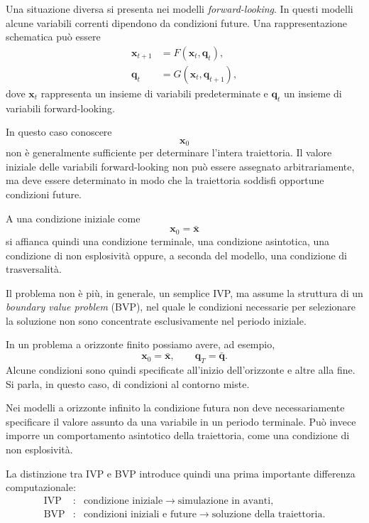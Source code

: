 \documentclass{book}
\begin{document}
Una situazione diversa si presenta nei modelli \emph{forward-looking}.
In questi modelli alcune variabili correnti dipendono da condizioni
future. Una rappresentazione schematica può essere
\[
\begin{aligned}
\mathbf{x}_{t+1}
&=
F(\mathbf{x}_t,\mathbf{q}_t),\\
\mathbf{q}_t
&=
G(\mathbf{x}_t,\mathbf{q}_{t+1}),
\end{aligned}
\]
dove $\mathbf{x}_t$ rappresenta un insieme di variabili predeterminate
e $\mathbf{q}_t$ un insieme di variabili forward-looking.

In questo caso conoscere
\[
\mathbf{x}_0
\]
non è generalmente sufficiente per determinare l'intera traiettoria.
Il valore iniziale delle variabili forward-looking non può essere
assegnato arbitrariamente, ma deve essere determinato in modo che la
traiettoria soddisfi opportune condizioni future.

A una condizione iniziale come
\[
\mathbf{x}_0=\bar{\mathbf{x}}
\]
si affianca quindi una condizione terminale, una condizione asintotica,
una condizione di non esplosività oppure, a seconda del modello, una
condizione di trasversalità.

Il problema non è più, in generale, un semplice IVP, ma assume la
struttura di un \emph{boundary value problem} (BVP), nel quale le
condizioni necessarie per selezionare la soluzione non sono concentrate
esclusivamente nel periodo iniziale.

In un problema a orizzonte finito possiamo avere, ad esempio,
\[
\mathbf{x}_0=\bar{\mathbf{x}},
\qquad
\mathbf{q}_T=\bar{\mathbf{q}}.
\]
Alcune condizioni sono quindi specificate all'inizio dell'orizzonte e
altre alla fine. Si parla, in questo caso, di condizioni al contorno
miste.

Nei modelli a orizzonte infinito la condizione futura non deve
necessariamente specificare il valore assunto da una variabile in un
periodo terminale. Può invece imporre un comportamento asintotico della
traiettoria, come una condizione di non esplosività.

La distinzione tra IVP e BVP introduce quindi una prima importante
differenza computazionale:
\[
\boxed{
\begin{array}{rcl}
\text{IVP}
&:&
\text{condizione iniziale}
\longrightarrow
\text{simulazione in avanti},\\[2mm]
\text{BVP}
&:&
\text{condizioni iniziali e future}
\longrightarrow
\text{soluzione della traiettoria}.
\end{array}
}
\]
\end{document}
